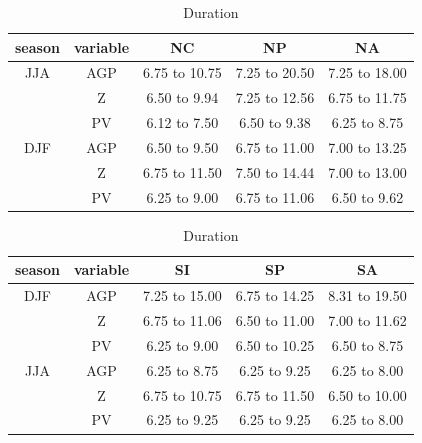 \documentclass[smallextended]{svjour3}       %
\numberwithin{equation}{section}
\begin{document}
\begin{table}[b]
    \caption{Duration}
    \centering
    \begin{tabular}{c|c|c|c|c}
season&variable & NC & NP & NA \\ 
  \hline
JJA & AGP&6.75 to 10.75 & 7.25 to 20.50 & 7.25 to 18.00 \\ 
&Z & 6.50 to 9.94 & 7.25 to 12.56 & 6.75 to 11.75 \\ &PV& 6.12 to 7.50 & 6.50 to 9.38 & 6.25 to 8.75 \\ 
\hline
  DJF & AGP&6.50 to 9.50 & 6.75 to 11.00 & 7.00 to 13.25 \\ 
    &Z & 6.75 to 11.50 & 7.50 to 14.44 & 7.00 to 13.00 \\ 
    &PV& 6.25 to 9.00 & 6.75 to 11.06 & 6.50 to 9.62 \\ 
    \end{tabular}
        \begin{tabular}{c|c|c|c|c}
season&variable &  SI & SP & SA \\ 
  \hline
DJF & AGP& 7.25 to 15.00 & 6.75 to 14.25 & 8.31 to 19.50 \\ 
&Z & 6.75 to 11.06 & 6.50 to 11.00 & 7.00 to 11.62 \\ 
&PV & 6.25 to 9.00 & 6.50 to 10.25 & 6.50 to 8.75 \\ 
\hline
  JJA & AGP & 6.25 to 8.75 & 6.25 to 9.25 & 6.25 to 8.00 \\
    &Z & 6.75 to 10.75 & 6.75 to 11.50 & 6.50 to 10.00 \\ 
    &PV& 6.25 to 9.25 & 6.25 to 9.25 & 6.25 to 8.00 \\ 
    \end{tabular}

    \label{tab:duration}
\end{table}
\end{document}
